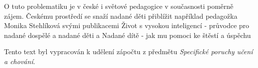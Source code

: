 \documentclass[a4paper]{scrartcl}
\begin{document}
O tuto problematiku je v české i světové pedagogice v současnosti poměrně zájem. Českému prostředí se snaží nadané děti přiblížit například pedagožka Monika Stehlíková svými publikacemi Život s vysokou inteligencí - průvodce pro nadané dospělé a nadané děti \cite{} a Nadané dítě - jak mu pomoci ke štěstí a úspěchu \cite{}



\vspace{36pt}
\indent Tento text byl vypracován k udělení zápočtu z předmětu {\it Specifické poruchy učení a chování}.

\newpage
\end{document}
